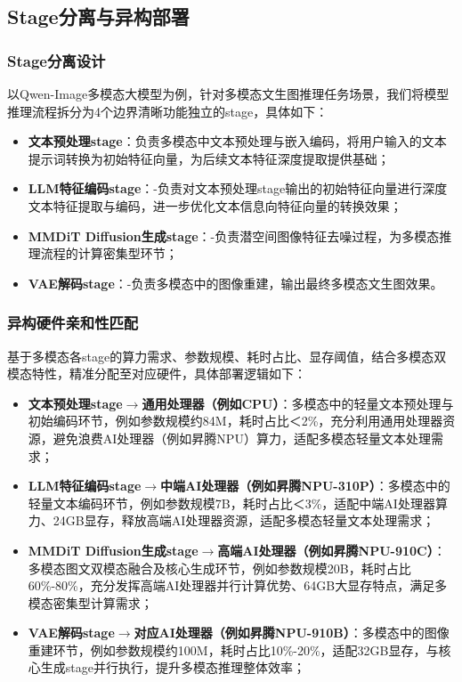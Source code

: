 \documentclass{ctexart}
\begin{document}
\subsection{Stage分离与异构部署}

\subsubsection{Stage分离设计}
以Qwen-Image多模态大模型为例，针对多模态文生图推理任务场景，我们将模型推理流程拆分为4个边界清晰功能独立的stage，具体如下：
\begin{itemize}
  \item \textbf{文本预处理stage}：负责多模态中文本预处理与嵌入编码，将用户输入的文本提示词转换为初始特征向量，为后续文本特征深度提取提供基础；
  \item \textbf{LLM特征编码stage}：-负责对文本预处理stage输出的初始特征向量进行深度文本特征提取与编码，进一步优化文本信息向特征向量的转换效果；
  \item \textbf{MMDiT Diffusion生成stage}：-负责潜空间图像特征去噪过程，为多模态推理流程的计算密集型环节；
  \item \textbf{VAE解码stage}：-负责多模态中的图像重建，输出最终多模态文生图效果。
\end{itemize}
\subsubsection{异构硬件亲和性匹配}
基于多模态各stage的算力需求、参数规模、耗时占比、显存阈值，结合多模态双模态特性，精准分配至对应硬件，具体部署逻辑如下：
\begin{itemize}
  \item \textbf{文本预处理stage$\rightarrow$通用处理器（例如CPU）}：多模态中的轻量文本预处理与初始编码环节，例如参数规模约84M，耗时占比＜2\%，充分利用通用处理器资源，避免浪费AI处理器（例如昇腾NPU）算力，适配多模态轻量文本处理需求；
  \item \textbf{LLM特征编码stage$\rightarrow$中端AI处理器（例如昇腾NPU-310P）}：多模态中的轻量文本编码环节，例如参数规模7B，耗时占比＜3\%，适配中端AI处理器算力、24GB显存，释放高端AI处理器资源，适配多模态轻量文本处理需求；
  \item \textbf{MMDiT Diffusion生成stage$\rightarrow$高端AI处理器（例如昇腾NPU-910C）}：多模态图文双模态融合及核心生成环节，例如参数规模20B，耗时占比60\%-80\%，充分发挥高端AI处理器并行计算优势、64GB大显存特点，满足多模态密集型计算需求；
  \item \textbf{VAE解码stage$\rightarrow$对应AI处理器（例如昇腾NPU-910B）}：多模态中的图像重建环节，例如参数规模约100M，耗时占比10\%-20\%，适配32GB显存，与核心生成stage并行执行，提升多模态推理整体效率；
\end{itemize}
\end{document}
